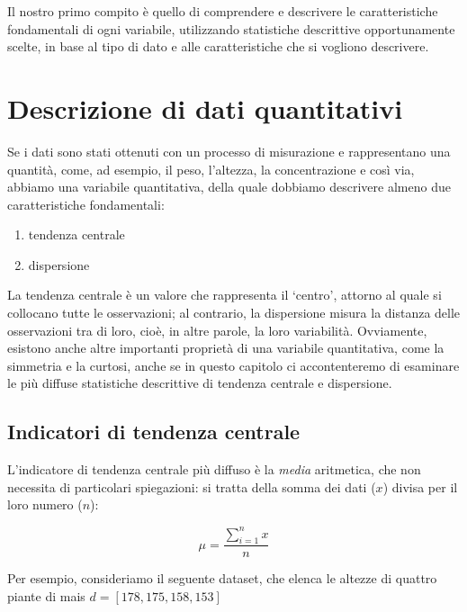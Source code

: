 \documentclass[a4paper,12pt,oneside]{book}
\providecommand{\tightlist}{%
  \setlength{\itemsep}{0pt}\setlength{\parskip}{0pt}}
\begin{document}
Il nostro primo compito è quello di comprendere e descrivere le caratteristiche fondamentali di ogni variabile, utilizzando statistiche descrittive opportunamente scelte, in base al tipo di dato e alle caratteristiche che si vogliono descrivere.

\hypertarget{descrizione-di-dati-quantitativi}{%
\section{Descrizione di dati quantitativi}\label{descrizione-di-dati-quantitativi}}

Se i dati sono stati ottenuti con un processo di misurazione e rappresentano una quantità, come, ad esempio, il peso, l'altezza, la concentrazione e così via, abbiamo una variabile quantitativa, della quale dobbiamo descrivere almeno due caratteristiche fondamentali:

\begin{enumerate}
\def\labelenumi{\arabic{enumi}.}
\tightlist
\item
  tendenza centrale
\item
  dispersione
\end{enumerate}

La tendenza centrale è un valore che rappresenta il `centro', attorno al quale si collocano tutte le osservazioni; al contrario, la dispersione misura la distanza delle osservazioni tra di loro, cioè, in altre parole, la loro variabilità. Ovviamente, esistono anche altre importanti proprietà di una variabile quantitativa, come la simmetria e la curtosi, anche se in questo capitolo ci accontenteremo di esaminare le più diffuse statistiche descrittive di tendenza centrale e dispersione.

\hypertarget{indicatori-di-tendenza-centrale}{%
\subsection{Indicatori di tendenza centrale}\label{indicatori-di-tendenza-centrale}}

L'indicatore di tendenza centrale più diffuso è la \emph{media} aritmetica, che non necessita di particolari spiegazioni: si tratta della somma dei dati (\(x\)) divisa per il loro numero (\(n\)):

\[\mu = \frac{\sum\limits_{i = 1}^n x}{n}\]

Per esempio, consideriamo il seguente dataset, che elenca le altezze di quattro piante di mais \(d = [178, 175, 158, 153]\)
\end{document}
